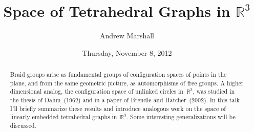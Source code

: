 \documentclass{UAmathtalk}
\author{Andrew Marshall}
\title{Space of Tetrahedral Graphs in $\mathbb R^3$}
\date{Thursday, November 8, 2012}
\begin{document}
\maketitle

\begin{abstract}
Braid groups arise as fundamental groups of configuration spaces of points in the plane, and from the same geometric picture, as automorphisms of free groups.  A higher dimensional analog, the configuration space of unlinked circles in~$\mathbb R^3$, was studied in the thesis of Dahm~(1962) and in a paper of Brendle and Hatcher~(2002).  In this talk I'll briefly summarize these results and introduce analogous work on the space of linearly embedded tetrahedral graphs in~$\mathbb R^3$.  Some interesting generalizations will be discussed.
\end{abstract}
\end{document}
